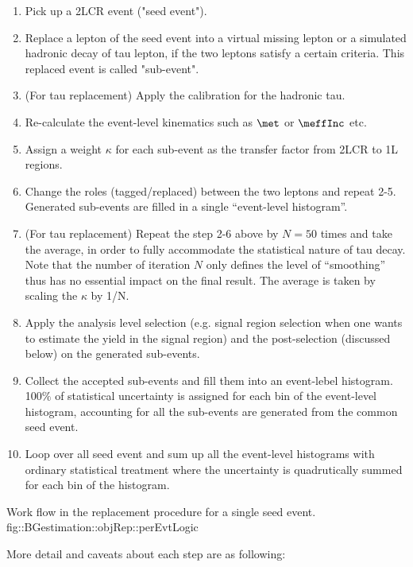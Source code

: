 \begin{enumerate}
\item Pick up a 2LCR event ("seed event").
\item Replace a lepton of the seed event into a virtual missing lepton or a simulated hadronic decay of tau lepton, if the two leptons satisfy a certain criteria. This replaced event is called "sub-event".
\item (For tau replacement) Apply the calibration for the hadronic tau.
\item Re-calculate the event-level kinematics such as $\met$ or $\meffInc$ etc.
\item Assign a weight $\kappa$ for each sub-event as the transfer factor from 2LCR to 1L regions.
\item Change the roles (tagged/replaced) between the two leptons and repeat 2-5. Generated sub-events are filled in a single ``event-level histogram''.
\item (For tau replacement) Repeat the step 2-6 above by $N=50$ times and take the average, in order to fully accommodate the statistical nature of tau decay. Note that the number of iteration $N$ only defines the level of ``smoothing'' thus has no essential impact on the final result. The average is taken by scaling the $\kappa$ by 1/N.

\item Apply the analysis level selection (e.g. signal region selection when one wants to estimate the yield in the signal region) and the post-selection (discussed below) on the generated sub-events. 
\item Collect the accepted sub-events and fill them into an event-lebel histogram. 100$\%$ of statistical uncertainty is assigned for each bin of the event-level histogram, accounting for all the sub-events are generated from the common seed event.
\item Loop over all seed event and sum up all the event-level histograms with ordinary statistical treatment where the uncertainty is quadrutically summed for each bin of the histogram. 
\end{enumerate}

{Work flow in the replacement procedure for a single seed event.}
{fig::BGestimation::objRep::perEvtLogic}

More detail and caveats about each step are as following:  \\

